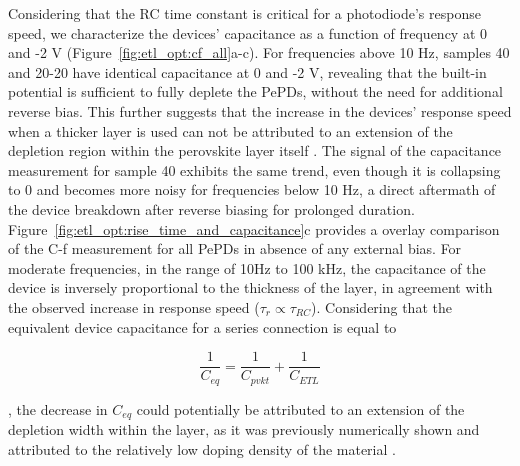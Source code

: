 Considering that the RC time constant is critical for a photodiode's response speed, we characterize the devices' capacitance as a function of frequency at 0 and -2 V (Figure~\ref{fig:etl_opt:cf_all}a-c). For frequencies above 10 Hz, samples 40 and 20-20 have identical capacitance at 0 and -2 V, revealing that the built-in potential is sufficient to fully deplete the PePDs, without the need for additional reverse bias. This further suggests that the increase in the devices' response speed when a thicker  layer is used can not be attributed to an extension of the depletion region within the perovskite layer itself \cite{Goushcha2017OnPhotodiodes}. The signal of the capacitance measurement for sample 40 exhibits the same trend, even though it is collapsing to 0 and becomes more noisy for frequencies below 10 Hz, a direct aftermath of the device breakdown after reverse biasing for prolonged duration. Figure~\ref{fig:etl_opt:rise_time_and_capacitance}c provides a overlay comparison of the C-f measurement for all PePDs in absence of any external bias. For moderate frequencies, in the range of 10Hz to 100 kHz, the capacitance of the device is inversely proportional to the thickness of the  layer, in agreement with the observed increase in response speed ($\tau_r \propto \tau_{RC}$). Considering that the equivalent device capacitance for a series connection is equal to 
 
 \begin{equation}
    \frac{1}{C_{eq}} = \frac{1}{C_{pvkt}} + \frac{1}{C_{ETL}}
    \label{eg:series_cap}
 \end{equation}

, the decrease in $C_{eq}$ could potentially be attributed to an extension of the depletion width within the  layer, as it was previously numerically shown and attributed to the relatively low doping density of the material \cite{Pham2023EffectsCells}.  

